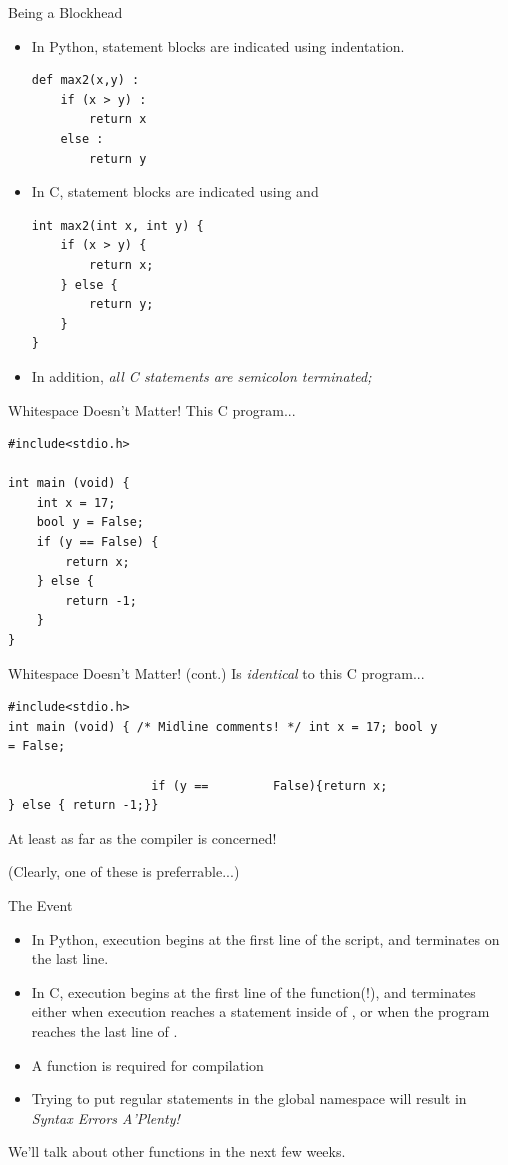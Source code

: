 \documentclass[11pt]{beamer}
\let\OldTexttt\texttt
\renewcommand{\texttt}[1]{\OldTexttt{\color{teal}{#1}}}
\begin{document}
\begin{frame}[fragile=singleslide]{Being a Blockhead}
\begin{itemize}
\item In Python, statement blocks are indicated using indentation.
\begin{lstlisting}[style=Python]
def max2(x,y) :
	if (x > y) :
		return x
	else :
		return y
\end{lstlisting}
\item In C, statement blocks are indicated using \texttt{$\{$} and \texttt{$\}$}
\begin{lstlisting}[style=C]
int max2(int x, int y) {
	if (x > y) {
		return x;
	} else {
		return y;
	}
}
\end{lstlisting}
\item In addition, \emph{all C statements are semicolon terminated;}
\end{itemize}
\end{frame}

\begin{frame}[fragile=singleslide]{Whitespace Doesn't Matter!}
This C program...
\begin{lstlisting}[style=C]
#include<stdio.h>

int main (void) { 
	int x = 17;
	bool y = False;
	if (y == False) {
		return x;
	} else {
		return -1;
	}
}
\end{lstlisting}
\end{frame}
\begin{frame}[fragile=singleslide]{Whitespace Doesn't Matter! (cont.)}
Is \emph{identical} to this C program...
\begin{lstlisting}[style=C]
#include<stdio.h>
int main (void) { /* Midline comments! */ int x = 17; bool y 
= False;
	
					if (y ==         False){return x;
} else { return -1;}}
\end{lstlisting}
At least as far as the compiler is concerned! 

(Clearly, one of these is preferrable...)
\end{frame}

\begin{frame}{The \texttt{main} Event}
\begin{itemize}
\item In Python, execution begins at the first line of the script, and terminates on the last line.  
\item In C, execution begins at the first line of the \texttt{main} function(!), and terminates either when execution reaches a \texttt{return} statement inside of \texttt{main}, or when the program reaches the last line of \texttt{main}.
\item A \texttt{main} function is required for compilation
\item Trying to put regular statements in the global namespace will result in \emph{Syntax Errors A'Plenty!}
\end{itemize}
We'll talk about other functions in the next few weeks.
\end{frame}
\end{document}
